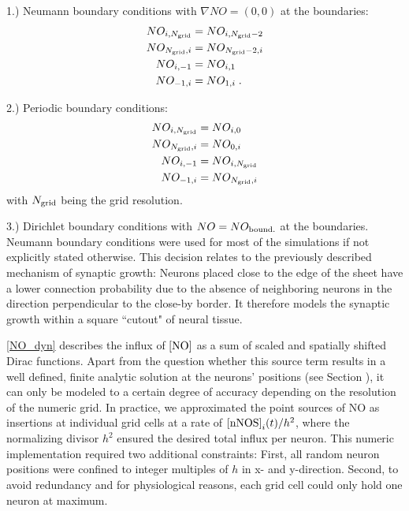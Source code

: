 \documentclass[10pt,letterpaper]{article}
\begin{document}
1.) Neumann boundary conditions with $\nabla NO = (0,0)$ at the boundaries:
\begin{align}
NO_{i,N_{\rm grid}} &= NO_{i,N_{\rm grid}-2} \label{Neumann_Cond_1} \\
NO_{N_{\rm grid},i} &= NO_{N_{\rm grid}-2,i} \label{Neumann_Cond_2} \\
NO_{i,-1} &= NO_{i,1} \label{Neumann_Cond_3} \\
NO_{-1,i} &= NO_{1,i} \; . \label{Neumann_Cond_4}
\end{align}

2.) Periodic boundary conditions:
\begin{align}
NO_{i,N_{\rm grid}} &= NO_{i,0} \label{Periodic_Cond_1} \\
NO_{N_{\rm grid},i} &= NO_{0,i} \label{Periodic_Cond_2} \\
NO_{i,-1} &= NO_{i,N_{\rm grid}} \label{Periodic_Cond_3} \\
NO_{-1,i} &= NO_{N_{\rm grid},i} \label{Periodic_Cond_4}
\end{align}
with $N_{\rm grid}$ being the grid resolution.

3.) Dirichlet boundary conditions with $NO = NO_{\rm bound.}$ at the boundaries.\\
Neumann boundary conditions were used for most of the simulations if not explicitly stated otherwise. This decision relates to the previously described mechanism of synaptic growth: Neurons placed close to the edge of the sheet have a lower connection probability due to the absence of neighboring neurons in the direction perpendicular to the close-by border. It therefore models the synaptic growth within a square ``cutout" of neural tissue.

\eqref{NO_dyn} describes the influx of $\rm [NO]$ as a sum of scaled and spatially shifted Dirac functions. Apart from the question whether this source term results in a well defined, finite analytic solution at the neurons' positions (see Section \textit{}), it can only be modeled to a certain degree of accuracy depending on the resolution of the numeric grid. In practice, we approximated the point sources of NO as insertions at individual grid cells at a rate of ${\rm [nNOS]}_i(t) / h^2$, where the normalizing divisor $h^2$ ensured the desired total influx per neuron. This numeric implementation required two additional constraints: First, all random neuron positions were confined to integer multiples of $h$ in x- and y-direction. Second, to avoid redundancy and for physiological reasons, each grid cell could only hold one neuron at maximum.
\end{document}
